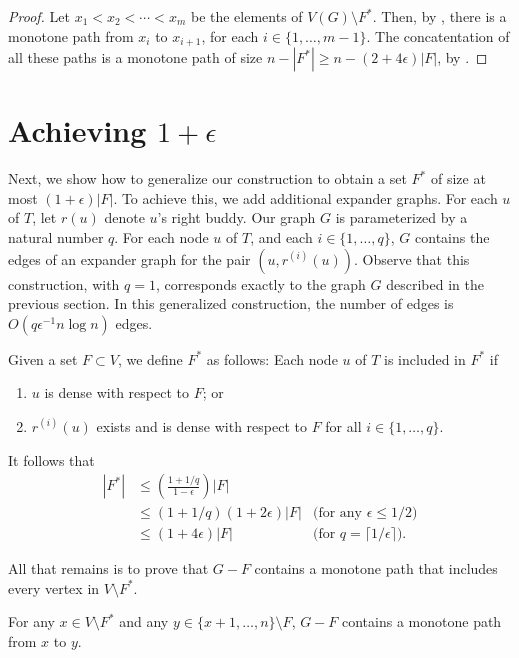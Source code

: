 \documentclass{patmorin}
\begin{document}
\begin{proof}
	Let $x_1<x_2<\cdots<x_m$ be the elements of $V(G)\setminus F^*$.
	Then, by , there is a monotone path from $x_i$
	to $x_{i+1}$, for each $i\in\{1,\ldots,m-1\}$.
	The concatentation of all these paths is a monotone path of size $n-|F^*| \ge n-(2+4\epsilon)|F|$, by .
\end{proof}

\section{Achieving $1+\epsilon$}


Next, we show how to generalize our construction to obtain a set $F^*$
of size at most $(1+\epsilon)|F|$.  To achieve this, we add additional
expander graphs. For each $u$ of $T$, let $r(u)$ denote $u$'s right buddy.
Our graph $G$ is parameterized by a natural number $q$.  For each
node $u$ of $T$, and each $i\in\{1,\ldots,q\}$, $G$ contains the edges
of an expander graph for the pair $(u,r^{(i)}(u))$.  Observe that
this construction, with $q=1$, corresponds exactly to the graph $G$
described in the previous section.  In this generalized construction,
the number of edges is $O(q\epsilon^{-1} n\log n)$ edges.

Given a set $F\subset V$, we define $F^*$ as follows: Each node $u$ of $T$
is included in $F^*$ if
\begin{enumerate}
   \item $u$ is dense with respect to $F$; or
   \item $r^{(i)}(u)$ exists and is dense with respect to 
	 $F$ for all $i\in\{1,\ldots,q\}$.
\end{enumerate}
It follows that 
\begin{align*} 
	|F^*| & \le \left(\frac{1+1/q}{1-\epsilon}\right)|F| \\
	& \le (1+1/q)(1+2\epsilon)|F| &\text{(for any $\epsilon \le 1/2$)} \\
	& \le (1+4\epsilon)|F| &\text{(for $q=\lceil 1/\epsilon\rceil$).}
\end{align*}

All that remains is to prove that $G-F$ contains a monotone path that includes every vertex in $V\setminus F^*$.

\begin{clm}
  For any $x\in V\setminus F^*$ and any $y\in \{x+1,\ldots,n\}\setminus
  F$, $G-F$ contains a monotone path from $x$ to $y$.
\end{clm}
\end{document}
